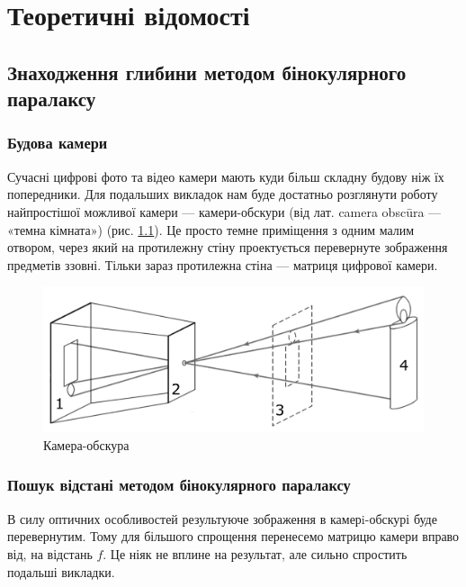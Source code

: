 \chapter{Теоретичні відомості}

\section{Знаходження глибини методом бінокулярного паралаксу}
\subsection{Будова камери}
Сучасні цифрові фото та відео камери мають куди більш складну будову ніж їх попередники. Для подальших викладок нам буде достатньо розглянути роботу найпростішої можливої камери --- камери-обскури (від лат. camera obscūra — «темна кімната») (рис. \ref{1.1.1 - Camera-obscura}). Це просто темне приміщення з одним малим отвором, через який на протилежну стіну проектується перевернуте зображення предметів ззовні. Тільки зараз протилежна стіна --- матриця цифрової камери. 
\begin{figure}[h!]
	\centering
	\includegraphics[scale = 0.5]{CO2.pdf}
	\caption{Камера-обскура}
	\label{1.1.1 - Camera-obscura}
\end{figure}


\subsection{Пошук відстані методом бінокулярного паралаксу}
В силу оптичних особливостей результуюче зображення в камерi-обскурі буде перевернутим. Тому для більшого спрощення перенесемо матрицю камери вправо від, на відстань $f$. Це ніяк не вплине на результат, але сильно спростить подальші викладки.

